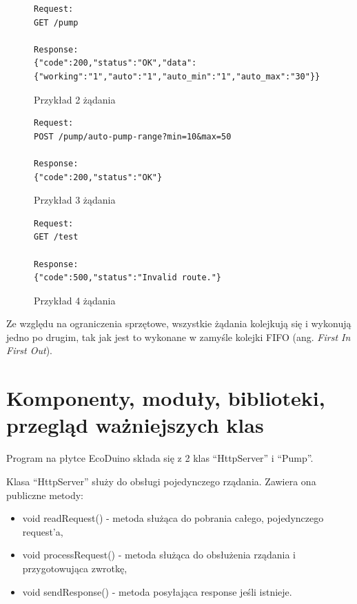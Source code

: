 \documentclass[a4paper,twoside,12pt]{book}
\begin{document}
\begin{figure}[H]
   \centering
   \footnotesize
   \begin{lstlisting}
Request:
GET /pump

Response:
{"code":200,"status":"OK","data":{"working":"1","auto":"1","auto_min":"1","auto_max":"30"}}
   \end{lstlisting}
   \caption{Przykład 2 żądania}
   \label{code:3}
\end{figure}

\begin{figure}[H]
   \centering
   \footnotesize
   \begin{lstlisting}
Request:
POST /pump/auto-pump-range?min=10&max=50

Response:
{"code":200,"status":"OK"}
   \end{lstlisting}
   \caption{Przykład 3 żądania}
   \label{code:4}
\end{figure}

\begin{figure}[H]
   \centering
   \footnotesize
   \begin{lstlisting}
Request:
GET /test

Response:
{"code":500,"status":"Invalid route."}
   \end{lstlisting}
   \caption{Przykład 4 żądania}
   \label{code:5}
\end{figure}

Ze względu na ograniczenia sprzętowe, wszystkie żądania kolejkują się i wykonują jedno po drugim, tak jak jest to wykonane w zamyśle kolejki FIFO (ang. \textit{First In First Out}).

\section{Komponenty, moduły, biblioteki, przegląd ważniejszych klas}

Program na płytce EcoDuino składa się z 2 klas ``HttpServer'' i ``Pump''.

Klasa ``HttpServer'' służy do obsługi pojedynczego rządania. Zawiera ona publiczne metody:

\begin{itemize}
   \item void readRequest() - metoda służąca do pobrania całego, pojedynczego request'a,
   \item void processRequest() - metoda służąca do obsłużenia rządania i przygotowująca zwrotkę,
   \item void sendResponse() - metoda posyłająca response jeśli istnieje.
\end{itemize}
\end{document}
